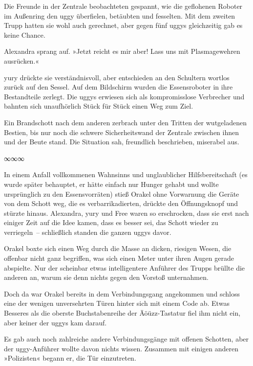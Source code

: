 Die Freunde in der Zentrale beobachteten gespannt, wie die geflohenen Roboter im Außenring den uggy überfielen, betäubten und fesselten. Mit dem zweiten Trupp hatten sie wohl auch gerechnet, aber gegen fünf uggys gleichzeitig gab es keine Chance.

Alexandra sprang auf. »Jetzt reicht es mir aber! Lass uns mit Plasmagewehren ausrücken.«

yury drückte sie verständnisvoll, aber entschieden an den Schultern wortlos zurück auf den Sessel. Auf dem Bildschirm wurden die Essensroboter in ihre Bestandteile zerlegt. Die uggys erwiesen sich als kompromisslose Verbrecher und bahnten sich unaufhörlich Stück für Stück einen Weg zum Ziel.

Ein Brandschott nach dem anderen zerbrach unter den Tritten der wutgeladenen Bestien, bis nur noch die schwere Sicherheitswand der Zentrale zwischen ihnen und der Beute stand. Die Situation sah, freundlich beschrieben, miserabel aus.

\begin{center}
    ∞∞∞
\end{center}

In einem Anfall vollkommenen Wahnsinns und unglaublicher Hilfsbereitschaft (es wurde später behauptet, er hätte einfach nur Hunger gehabt und wollte ursprünglich zu den Essensvorräten) stieß Orakel ohne Vorwarnung die Geräte von dem Schott weg, die es verbarrikadierten, drückte den Öffnungsknopf und stürzte hinaus. Alexandra, yury und Free waren so erschrocken, dass sie erst nach einiger Zeit auf die Idee kamen, dass es besser sei, das Schott wieder zu verriegeln~– schließlich standen die ganzen uggys davor.

Orakel boxte sich einen Weg durch die Masse an dicken, riesigen Wesen, die offenbar nicht ganz begriffen, was sich einen Meter unter ihren Augen gerade abspielte. Nur der scheinbar etwas intelligentere Anführer des Trupps brüllte die anderen an, warum sie denn nichts gegen den Vorstoß unternahmen.

Doch da war Orakel bereits in dem Verbindungsgang angekommen und schloss eine der wenigen unversehrten Türen hinter sich mit einem Code ab. Etwas Besseres als die oberste Buchstabenreihe der Äöüzz-Tastatur fiel ihm nicht ein, aber keiner der uggys kam darauf.

Es gab auch noch zahlreiche andere Verbindungsgänge mit offenen Schotten, aber der uggy-Anführer wollte davon nichts wissen. Zusammen mit einigen anderen »Polizisten« begann er, die Tür einzutreten.

